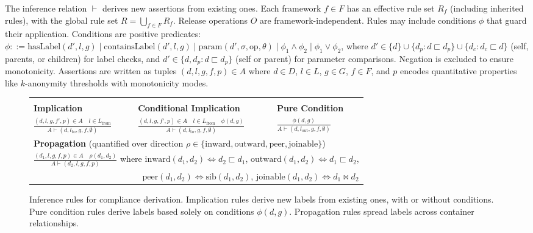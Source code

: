 \documentclass{IOS-Book-Article}
\begin{document}
The inference relation $\vdash$ derives new assertions from existing ones. Each framework $f \in F$ has an effective rule set $R_f$ (including inherited rules), with the global rule set $R = \bigcup_{f \in F} R_f$. Release operations $O$ are framework-independent. Rules may include conditions $\phi$ that guard their application. Conditions are positive predicates: $\phi ::= \text{hasLabel}(d',l,g) \mid \text{containsLabel}(d',l,g) \mid \text{param}(d',\sigma,\text{op},\theta) \mid \phi_1 \land \phi_2 \mid \phi_1 \lor \phi_2$, where $d' \in \{d\} \cup \{d_p : d \sqsubset d_p\} \cup \{d_c : d_c \sqsubset d\}$ (self, parents, or children) for label checks, and $d' \in \{d, d_p : d \sqsubset d_p\}$ (self or parent) for parameter comparisons. Negation is excluded to ensure monotonicity. Assertions are written as tuples $(d,l,g,f,p) \in A$ where $d \in D$, $l \in L$, $g \in G$, $f \in F$, and $p$ encodes quantitative properties like $k$-anonymity thresholds with monotonicity modes.
\begin{figure*}[ht]
\centering
\footnotesize
\setlength{\tabcolsep}{2pt}
\renewcommand{\arraystretch}{0.9}
\begin{tabular}{@{}lll@{}}
\hline \\[-0.5em]
\textbf{Implication} & \textbf{Conditional Implication} & \textbf{Pure Condition} \\[0.2em]
$\displaystyle\frac{(d,l,g,f',p) \in A \quad l \in L_{\text{from}}}
{A \vdash (d,l_{\text{to}},g,f,\emptyset)}$ & 
$\displaystyle\frac{(d,l,g,f',p) \in A \quad l \in L_{\text{from}} \quad \phi(d,g)}
{A \vdash (d,l_{\text{to}},g,f,\emptyset)}$ &
$\displaystyle\frac{\phi(d,g)}
{A \vdash (d,l_{\text{out}},g,f,\emptyset)}$ \\[0.8em]

\multicolumn{3}{l}{\textbf{Propagation} (quantified over direction $\rho \in \{\text{inward}, \text{outward}, \text{peer}, \text{joinable}\}$)} \\[0.2em]
\multicolumn{3}{l}{$\displaystyle\frac{(d_1,l,g,f,p) \in A \quad \rho(d_1,d_2)}
{A \vdash (d_2,l,g,f,p)}$ where $\text{inward}(d_1,d_2) \iff d_2 \sqsubset d_1$, $\text{outward}(d_1,d_2) \iff d_1 \sqsubset d_2$,} \\
\multicolumn{3}{r}{$\text{peer}(d_1,d_2) \iff \text{sib}(d_1,d_2)$, $\text{joinable}(d_1,d_2) \iff d_1 \bowtie d_2$} \\[0.3em]
\hline
\end{tabular}
\caption{Inference rules for compliance derivation.\footnotemark{} Implication rules derive new labels from existing ones, with or without conditions. Pure condition rules derive labels based solely on conditions $\phi(d,g)$. Propagation rules spread labels across container relationships.}
\label{fig:inference-rules}
\end{figure*}
\end{document}
